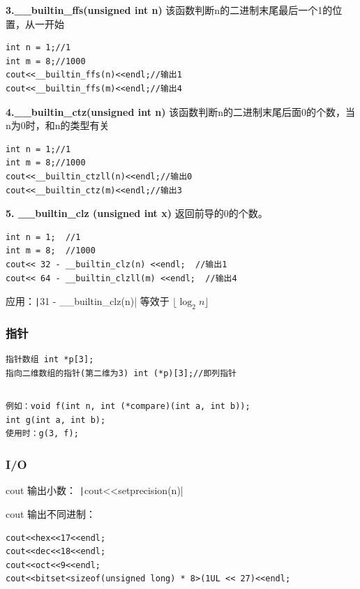 \documentclass[twocolumn,10pt]{ctexart}
\begin{document}
\textbf{3.\_\_builtin\_ffs(unsigned int n)} 该函数判断n的二进制末尾最后一个1的位置，从一开始

\begin{verbatim}
int n = 1;//1
int m = 8;//1000
cout<<__builtin_ffs(n)<<endl;//输出1
cout<<__builtin_ffs(m)<<endl;//输出4
\end{verbatim}

\textbf{4.\_\_builtin\_ctz(unsigned int n)} 该函数判断n的二进制末尾后面0的个数，当n为0时，和n的类型有关

\begin{verbatim}
int n = 1;//1
int m = 8;//1000
cout<<__builtin_ctzll(n)<<endl;//输出0
cout<<__builtin_ctz(m)<<endl;//输出3
\end{verbatim}

\textbf{5. \_\_builtin\_clz (unsigned int x)} 返回前导的0的个数。

\begin{verbatim}
int n = 1;  //1
int m = 8;  //1000
cout<< 32 - __builtin_clz(n) <<endl;  //输出1
cout<< 64 - __builtin_clzll(m) <<endl;  //输出4
\end{verbatim}

应用：\texttt|31 - __builtin_clz(n)| 等效于 $\lfloor\log_2n\rfloor$

\subsubsection{指针}

\begin{verbatim}
指针数组 int *p[3];
指向二维数组的指针(第二维为3) int (*p)[3];//即列指针
\end{verbatim}

\inputminted{cpp}{code/ext_078.cpp}

\begin{verbatim}
例如：void f(int n, int (*compare)(int a, int b));
int g(int a, int b);
使用时：g(3, f);
\end{verbatim}

\subsubsection{I/O}

cout 输出小数： \texttt|cout<<setprecision(n)|

cout 输出不同进制：

\begin{verbatim}
cout<<hex<<17<<endl;
cout<<dec<<18<<endl;
cout<<oct<<9<<endl;
cout<<bitset<sizeof(unsigned long) * 8>(1UL << 27)<<endl;
\end{verbatim}
\end{document}

